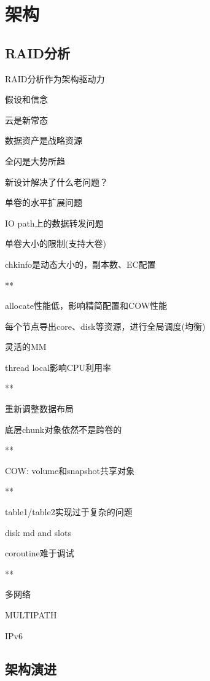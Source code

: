 \chapter{架构}

\section{RAID分析}

RAID分析作为架构驱动力

假设和信念
\begin{enumbox}
\item 云是新常态
\item 数据资产是战略资源
\item 全闪是大势所趋
\end{enumbox}

新设计解决了什么老问题？
\begin{enumbox}
\item 单卷的水平扩展问题
\item IO path上的数据转发问题
\item 单卷大小的限制(支持大卷)
\item chkinfo是动态大小的，副本数、EC配置
\item ***
\item allocate性能低，影响精简配置和COW性能
\item 每个节点导出core、disk等资源，进行全局调度(均衡)
\item 灵活的MM
\item thread local影响CPU利用率
\item ***
\item 重新调整数据布局
\item 底层chunk对象依然不是跨卷的
\item ***
\item COW: volume和snapshot共享对象
\item ***
\item table1/table2实现过于复杂的问题
\item disk md and slots
\item coroutine难于调试
\item ***
\item 多网络
\item MULTIPATH
\item IPv6
\end{enumbox}

\section{架构演进}

